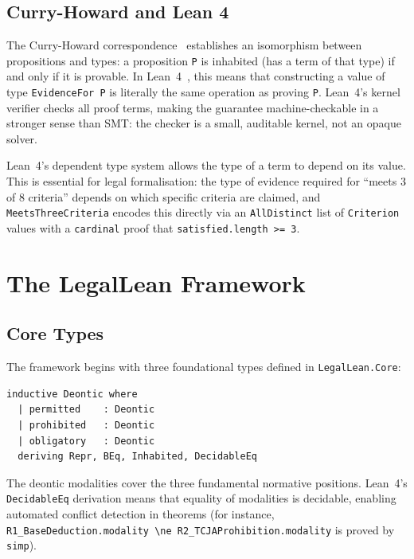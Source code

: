 \documentclass[runningheads]{llncs}
\begin{document}
\subsection{Curry-Howard and Lean 4}

The Curry-Howard correspondence~\cite{curry1934functionality,howard1980formulae}
establishes an isomorphism between propositions and types: a proposition
\texttt{P} is inhabited (has a term of that type) if and only if it is provable.
In Lean~4~\cite{demoura2021lean4}, this means that constructing a value of type
\texttt{EvidenceFor P} is literally the same operation as proving \texttt{P}.
Lean~4's kernel verifier checks all proof terms, making the guarantee
machine-checkable in a stronger sense than SMT: the checker is a small,
auditable kernel, not an opaque solver.

Lean~4's dependent type system allows the type of a term to depend on its value.
This is essential for legal formalisation: the type of evidence required for
``meets 3 of 8 criteria'' depends on which specific criteria are claimed, and
\texttt{MeetsThreeCriteria} encodes this directly via an \texttt{AllDistinct}
list of \texttt{Criterion} values with a \texttt{cardinal} proof that
\texttt{satisfied.length >= 3}.

\section{The LegalLean Framework}

\subsection{Core Types}

The framework begins with three foundational types defined in
\texttt{LegalLean.Core}:

\begin{lstlisting}[language=lean4]
inductive Deontic where
  | permitted    : Deontic
  | prohibited   : Deontic
  | obligatory   : Deontic
  deriving Repr, BEq, Inhabited, DecidableEq
\end{lstlisting}

The deontic modalities cover the three fundamental normative positions. Lean~4's
\texttt{DecidableEq} derivation means that equality of modalities is decidable,
enabling automated conflict detection in theorems (for instance,
\texttt{R1\_BaseDeduction.modality~\textbackslash{}ne~R2\_TCJAProhibition.modality} is proved by
\texttt{simp}).
\end{document}
